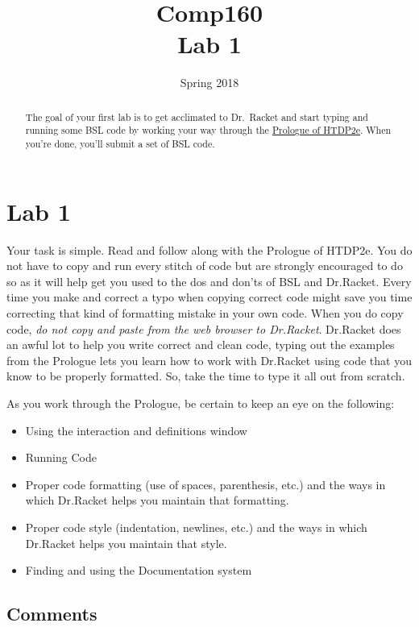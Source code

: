 \documentclass[nobib]{tufte-handout}
\title{Comp160 \\ Lab 1 }
\author{}
\date{ Spring 2018 }
\begin{document}
\maketitle

\begin{abstract}
The goal of your first lab is to get acclimated to Dr.\ Racket and start typing and running some BSL code by working your way through the \href{http://htdp.org/2018-01-06/Book/part_prologue.html}{Prologue of HTDP2e}. When you're done, you'll submit a set of BSL code.
\end{abstract}


\section{Lab 1}

Your task is simple. Read and follow along with the Prologue of HTDP2e.  You do not have to copy and run every stitch of code but are strongly encouraged to do so as it will help get you used to the dos and don'ts of BSL and Dr.Racket.  Every time you make and correct a typo when copying correct code might save you time correcting that kind of formatting mistake in your own code. When you do copy code, \textit{do not copy and paste from the web browser to Dr.Racket}.  Dr.Racket does an awful lot to help you write correct and clean code, typing out the examples from the Prologue lets you learn how to work with Dr.Racket using code that you know to be properly formatted. So, take the time to type it all out from scratch.

As you work through the Prologue, be certain to keep an eye on the following:
\begin{itemize}
  \item Using the interaction and definitions window
  \item Running Code
  \item Proper code formatting (use of spaces, parenthesis, etc.) and the ways in which Dr.Racket helps you maintain that formatting.
  \item Proper code style (indentation, newlines, etc.) and the ways in which Dr.Racket helps you maintain that style.
  \item Finding and using the Documentation system
\end{itemize}

\subsection{Comments}
\end{document}
